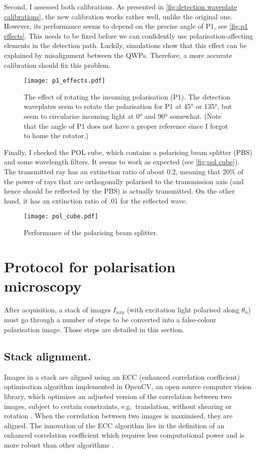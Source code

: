 Second, I assessed both calibrations. As presented in \autoref{fig:detection waveplate calibrations}, the new calibration works rather well, unlike the original one. However, its performance seems to depend on the precise angle of P1, see \autoref{fig:p1 effects}.
This needs to be fixed before we can confidently use polarisation-affecting elements in the detection path. Luckily, simulations show that this effect can be explained by misalignment between the QWPs. Therefore, a more accurate calibration should fix this problem.

\begin{figure}[h]
	\centering
	\texttt{[image: p1\_effects.pdf]}
	\caption{
		The effect of rotating the incoming polarisation (P1). The detection waveplates seem to rotate the polarisation for P1 at \ang{45} or \ang{135}, but seem to circularise incoming light at \ang{0} and \ang{90} somewhat. (Note that the angle of P1 does not have a proper reference since I forgot to home the rotator.)
	}
	\label{fig:p1 effects}
\end{figure}


Finally, I checked the POL cube, which contains a polarising beam splitter (PBS) and some wavelength filters. It seems to work as expected (see \autoref{fig:pol cube}). The transmitted ray has an extinction ratio of about 0.2, meaning that 20\% of the power of rays that are orthogonally polarised to the transmission axis (and hence should be reflected by the PBS) is actually transmitted. On the other hand, it has an extinction ratio of .01 for the reflected wave.

\begin{figure}
	\centering
	\texttt{[image: pol\_cube.pdf]}
	\caption{Performance of the polarising beam splitter.}
	\label{fig:pol cube}
\end{figure}

\section{Protocol for polarisation microscopy}
\label{sec:polarisation microsocpy protocol}

After acquisition, a stack of images $ I_{nxy} $ (with excitation light polarised along $ \theta_n $) must go through a number of steps to be converted into a false-colour polarisation image. Those steps are detailed in this section.

\subsection{Stack alignment.} Images in a stack are aligned using an ECC (enhanced correlation coefficient) optimisation algorithm implemented in OpenCV, an open source computer vision library, which optimises an adjusted version of the correlation between two images, subject to certain constraints, e.g.~translation, without shearing or rotation \cite{Evangelidis2008}. When the correlation between two images is maximised, they are aligned. The innovation of the ECC algorithm lies in the definition of an enhanced correlation coefficient which requires less computational power and is more robust than other algorithms \cite{Evangelidis2008}. 

